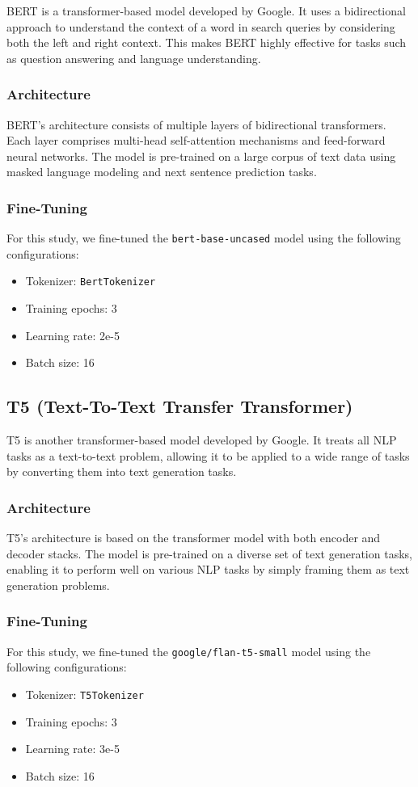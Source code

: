 \documentclass[conference]{IEEEtran}
\begin{document}
BERT is a transformer-based model developed by Google. It uses a bidirectional approach to understand the context of a word in search queries by considering both the left and right context. This makes BERT highly effective for tasks such as question answering and language understanding.

\subsubsection{Architecture}
BERT's architecture consists of multiple layers of bidirectional transformers. Each layer comprises multi-head self-attention mechanisms and feed-forward neural networks. The model is pre-trained on a large corpus of text data using masked language modeling and next sentence prediction tasks.

\subsubsection{Fine-Tuning}
For this study, we fine-tuned the \texttt{bert-base-uncased} model using the following configurations:
\begin{itemize}
    \item Tokenizer: \texttt{BertTokenizer}
    \item Training epochs: 3
    \item Learning rate: 2e-5
    \item Batch size: 16
\end{itemize}

\subsection{T5 (Text-To-Text Transfer Transformer)}

T5 is another transformer-based model developed by Google. It treats all NLP tasks as a text-to-text problem, allowing it to be applied to a wide range of tasks by converting them into text generation tasks.

\subsubsection{Architecture}
T5's architecture is based on the transformer model with both encoder and decoder stacks. The model is pre-trained on a diverse set of text generation tasks, enabling it to perform well on various NLP tasks by simply framing them as text generation problems.

\subsubsection{Fine-Tuning}
For this study, we fine-tuned the \texttt{google/flan-t5-small} model using the following configurations:
\begin{itemize}
    \item Tokenizer: \texttt{T5Tokenizer}
    \item Training epochs: 3
    \item Learning rate: 3e-5
    \item Batch size: 16
\end{itemize}
\end{document}
